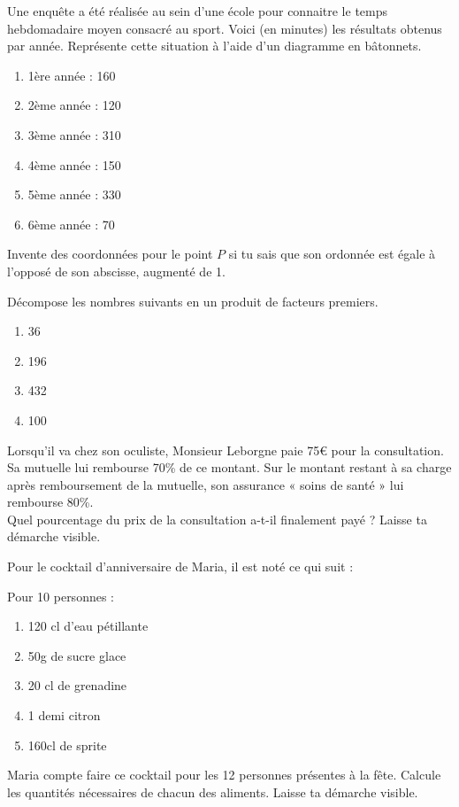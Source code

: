 \documentclass[12pt,parskip=half-, twoside=semi]{scrartcl}
\begin{document}
\begin{exercise}
    Une enquête a été réalisée au sein d'une école pour connaitre le temps hebdomadaire moyen consacré au sport. Voici (en minutes) les résultats obtenus par année. Représente cette situation à l'aide d'un diagramme en bâtonnets.
    \begin{enumerate} [cols=3, label=]
        \item 1ère année : 160
        \item 2ème année : 120
        \item 3ème année : 310
        \item 4ème année : 150
        \item 5ème année : 330
        \item 6ème année : 70
    \end{enumerate}
\end{exercise}

\begin{exercise}
    Invente des coordonnées pour le point $P$ si tu sais que son ordonnée est égale à l'opposé de son abscisse, augmenté de 1.
\end{exercise}

\begin{exercise}
    Décompose les nombres suivants en un produit de facteurs premiers. 
    \begin{enumerate}[cols=4]
        \item 36
        \item 196
        \item 432
        \item 100
    \end{enumerate}
\end{exercise}

\begin{exercise}
    Lorsqu’il va chez son oculiste, Monsieur Leborgne paie 75€ pour la consultation. Sa mutuelle lui rembourse 70\% de ce montant. Sur le montant restant à sa charge après remboursement de la mutuelle, son assurance « soins de santé » lui rembourse 80\%. \\
Quel pourcentage du prix de la consultation a-t-il finalement payé ? Laisse ta démarche visible.
\end{exercise}

\begin{exercise}
    Pour le cocktail d’anniversaire de Maria, il est noté ce qui suit : 

Pour 10 personnes :
\begin{enumerate}[label=-]
    \item 120 cl d’eau pétillante 
    \item 50g de sucre glace
    \item 20 cl de grenadine
    \item 1 demi citron
    \item 160cl de sprite
\end{enumerate}
Maria compte faire ce cocktail pour les 12 personnes présentes à la fête. Calcule les quantités nécessaires de chacun des aliments. Laisse ta démarche visible.
\end{exercise}
\end{document}
